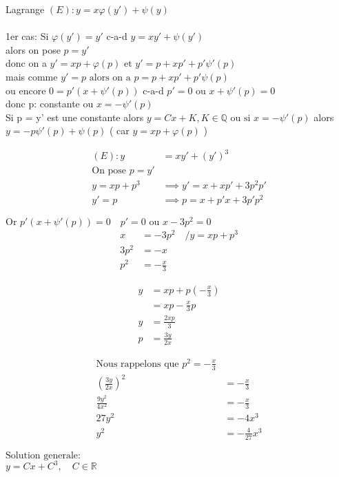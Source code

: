 Lagrange $(E): y = x \varphi(y') +\psi(y)$ \\ \\
1er cas: Si  $\varphi(y') = y'$ c-a-d $y = xy'+ \psi(y')$ \\
alors on pose $ p = y'$ \\
donc on a $ y' = xp + \varphi(p) \text{ et } y' = p + xp' + p'\psi'(p)$ \\
mais comme $ y' = p \text{ alors on a }  p = p + xp' + p'\psi(p)$ \\
ou encore $ 0 = p'(x + \psi'(p)) \text{ c-a-d } p' = 0 \text{ ou } x + \psi'(p) = 0$ \\
donc p: constante ou $ x = - \psi'(p)$ \\
Si p = y' est une constante alors $ y = Cx + K, K \in \mathbb{Q} \text{ ou si } x = -\psi'(p)$
alors $ y = -p\psi'(p) + \psi(p)$ ( car $y = xp + \varphi(p)$ )

\begin{align*}
	(E): y &= xy' + (y')^{3} \\
	\text{On pose } p = y' \\
	y = xp + p^3 &\implies y' = x + xp' + 3p^2p' \\
	y' = p &\implies p = x + p'x + 3p'p^2
\end{align*}

$\text{Or } p'(x + \psi'(p)) = 0 \quad p' = 0 \text{ ou } x-3p^2 = 0$ \\
\begin{align*}
	x &= -3p^2 \quad /y = xp + p^3 \\
	3p^2 &= -x \\
	p^2 &= -\frac{x}{3}
\end{align*}

\begin{align*}
	y &= xp + p(-\frac{x}{3}) \\
	  &= xp - \frac{x}{3}p \\
	y &= \frac{2xp}{3} \\
	p &= \frac{3y}{2x}
\end{align*}

\begin{align*}
	\text{Nous rappelons que } p^2 = -\frac{x}{3} \\
	(\frac{3y}{2x})^2 &= -\frac{x}{3} \\
	\frac{9y^2}{4x^2} &= -\frac{x}{3} \\
	27y^2 &= -4x^3 \\
	y^2 &= -\frac{4}{27}x^3
\end{align*}

$\text{Solution generale: }$ \\
$y = Cx + C^3, \quad C \in \mathbb{R}$ \\ \\
